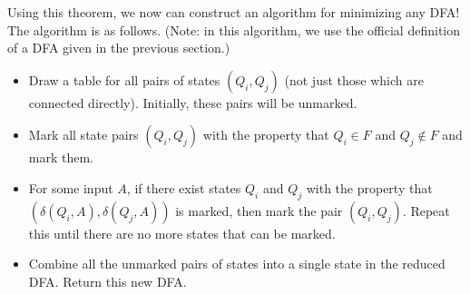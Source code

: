 \documentclass[11pt]{article}
\begin{document}
Using this theorem, we now can construct an algorithm for minimizing any DFA!  The algorithm is as follows.  (Note: in this algorithm, we use the official definition of a DFA given in the previous section.)

\begin{itemize}

\item Draw a table for all pairs of states $(Q_i,Q_j)$ (not just those which are connected directly).  Initially, these pairs will be unmarked.

\item Mark all state pairs $(Q_i,Q_j)$ with the property that $Q_i\in F$ and $Q_j\not\in F$ and mark them.

\item For some input $A$, if there exist states $Q_i$ and $Q_j$ with the property that $(\delta(Q_i,A),\delta(Q_j,A))$ is marked, then mark the pair $(Q_i,Q_j)$.  Repeat this until there are no more states that can be marked.

\item Combine all the unmarked pairs of states into a single state in the reduced DFA.  Return this new DFA.

\end{itemize}
\end{document}

